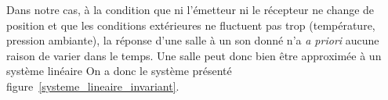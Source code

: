 Dans notre cas, à la condition que ni l'émetteur ni le récepteur ne change de position et que les conditions
extérieures ne fluctuent pas trop (température, pression ambiante), la réponse d'une salle à un son donné
n'a \textit{a priori} aucune raison de varier dans le temps.
Une salle peut donc bien être approximée à un système linéaire
On a donc le système présenté figure~\ref{systeme_lineaire_invariant}.



